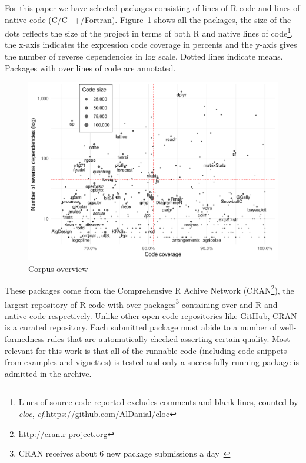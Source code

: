 \documentclass[acmsmall,review,anonymous]{acmart}\settopmatter{printfolios=true,printccs=false,printacmref=false}
\newcommand{\cf}{\emph{cf.}\xspace}
\begin{document}
For this paper we have selected \CorpusLoadable packages consisting of
\CorpusRCodeRnd lines of R code and \CorpusNativeCodeRnd lines of native code
(C/C++/Fortran).
Figure~\ref{fig:corpus} shows all the packages, the size of the dots reflects
the size of the project in terms of both R and native lines of code\footnote{
Lines of source code reported excludes comments and blank lines, counted by \emph{cloc}, \cf \url{https://github.com/AlDanial/cloc}}, the x-axis
indicates the expression code coverage in percents and the y-axis gives the
number of reverse dependencies in log scale. Dotted lines indicate means.
Packages with over \PackageSizeOutierRnd lines of code are annotated.

\begin{figure}[!h]  \centering
  \includegraphics[width=.8\linewidth]{plots/corpus.pdf}
  \caption{Corpus overview}\label{fig:corpus}
\end{figure}

These packages come from the Comprehensive R Achive Network
(CRAN\footnote{\url{http://cran.r-project.org}}), the largest repository of R
code with over \AllCranRnd packages\footnote{CRAN receives about 6 new package
  submissions a day~\cite{Ligges2017}} containing over \AllRCodeRnd and
\AllNativeCodeRnd R and native code respectively. Unlike other open code
repositories like GitHub, CRAN is a curated repository. Each submitted package
must abide to a number of well-formedness rules that are automatically checked
asserting certain quality. Most relevant for this work is that all of the
runnable code (including code snippets from examples and vignettes) is tested
and only a successfully running package is admitted in the archive.
\end{document}
